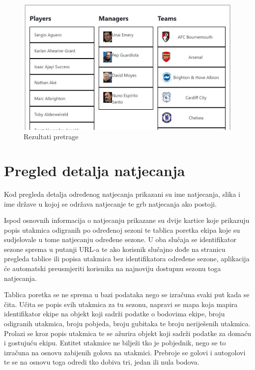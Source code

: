 \documentclass[times, utf8, zavrsni]{fer}
\begin{document}
\begin{figure}[htb]
\centering
\includegraphics[width=14cm]{images/search.jpg}
\caption{Rezultati pretrage}
\label{fig:search}
\end{figure}

\section{Pregled detalja natjecanja}

Kod pregleda detalja određenog natjecanja prikazani su ime natjecanja, slika i ime države u kojoj se održava natjecanje te grb natjecanja ako postoji.

Ispod osnovnih informacija o natjecanju prikazane su dvije kartice koje prikazuju popis utakmica odigranih po određenoj sezoni te tablica poretka ekipa koje su sudjelovale u tome natjecanju određene sezone.
U oba slučaja se identifikator sezone sprema u putanji URL-a te ako korisnik slučajno dođe na stranicu pregleda tablice ili popisa utakmica bez identifikatora određene sezone, aplikacija će automatski preusmjeriti korisnika na najnoviju dostupnu sezonu toga natjecanja.

Tablica poretka se ne sprema u bazi podataka nego se izračuna svaki put kada se čita.
Učita se popis svih utakmica za tu sezonu, napravi se mapa koja mapira identifikator ekipe na objekt koji sadrži podatke o bodovima ekipe, broju odigranih utakmica, broju pobjeda, broju gubitaka te broju neriješenih utakmica.
Prolazi se kroz popis utakmica te se ažurira objekt koji sadrži podatke za domaću i gostujuću ekipu.
Entitet utakmice ne bilježi tko je pobjednik, nego se to izračuna na osnovu zabijenih golova na utakmici. Prebroje se golovi i autogolovi te se na osnovu toga odredi tko dobiva tri, jedan ili nula bodova.
\end{document}
